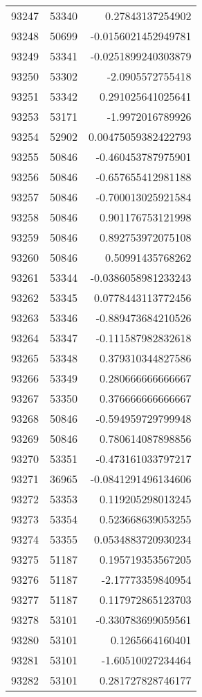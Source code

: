 \begin{tabular}{r | r | r}
93247 & 53340 & 0.27843137254902 \\
93248 & 50699 & -0.0156021452949781 \\
93249 & 53341 & -0.0251899240303879 \\
93250 & 53302 & -2.0905572755418 \\
93251 & 53342 & 0.291025641025641 \\
93253 & 53171 & -1.9972016789926 \\
93254 & 52902 & 0.00475059382422793 \\
93255 & 50846 & -0.460453787975901 \\
93256 & 50846 & -0.657655412981188 \\
93257 & 50846 & -0.700013025921584 \\
93258 & 50846 & 0.901176753121998 \\
93259 & 50846 & 0.892753972075108 \\
93260 & 50846 & 0.50991435768262 \\
93261 & 53344 & -0.0386058981233243 \\
93262 & 53345 & 0.0778443113772456 \\
93263 & 53346 & -0.889473684210526 \\
93264 & 53347 & -0.111587982832618 \\
93265 & 53348 & 0.379310344827586 \\
93266 & 53349 & 0.280666666666667 \\
93267 & 53350 & 0.376666666666667 \\
93268 & 50846 & -0.594959729799948 \\
93269 & 50846 & 0.780614087898856 \\
93270 & 53351 & -0.473161033797217 \\
93271 & 36965 & -0.0841291496134606 \\
93272 & 53353 & 0.119205298013245 \\
93273 & 53354 & 0.523668639053255 \\
93274 & 53355 & 0.0534883720930234 \\
93275 & 51187 & 0.195719353567205 \\
93276 & 51187 & -2.17773359840954 \\
93277 & 51187 & 0.117972865123703 \\
93278 & 53101 & -0.330783699059561 \\
93280 & 53101 & 0.1265664160401 \\
93281 & 53101 & -1.60510027234464 \\
93282 & 53101 & 0.281727828746177 \\

\end{tabular}
